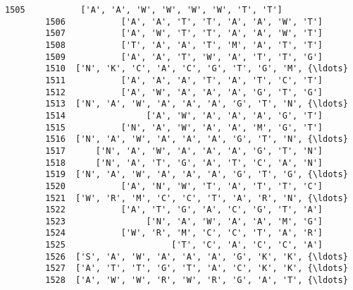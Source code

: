 \documentclass[11pt]{article}
\begin{document}
\begin{Verbatim}[commandchars=\\\{\}]
        1505           ['A', 'A', 'W', 'W', 'W', 'W', 'T', 'T']   
        1506           ['A', 'A', 'T', 'T', 'A', 'A', 'W', 'T']   
        1507           ['A', 'W', 'T', 'T', 'A', 'A', 'W', 'T']   
        1508           ['T', 'A', 'A', 'T', 'M', 'A', 'T', 'T']   
        1509           ['A', 'A', 'T', 'W', 'A', 'T', 'T', 'G']   
        1510  ['N', 'K', 'C', 'A', 'C', 'G', 'T', 'G', 'M', {\ldots}   
        1511           ['A', 'A', 'A', 'T', 'A', 'T', 'C', 'T']   
        1512           ['A', 'W', 'A', 'A', 'A', 'G', 'T', 'G']   
        1513  ['N', 'A', 'W', 'A', 'A', 'A', 'G', 'T', 'N', {\ldots}   
        1514                ['A', 'W', 'A', 'A', 'A', 'G', 'T']   
        1515           ['N', 'A', 'W', 'A', 'A', 'M', 'G', 'T']   
        1516  ['N', 'A', 'W', 'A', 'A', 'A', 'G', 'T', 'N', {\ldots}   
        1517      ['N', 'A', 'W', 'A', 'A', 'A', 'G', 'T', 'N']   
        1518      ['N', 'A', 'T', 'G', 'A', 'T', 'C', 'A', 'N']   
        1519  ['N', 'A', 'W', 'A', 'A', 'A', 'G', 'T', 'G', {\ldots}   
        1520           ['A', 'N', 'W', 'T', 'A', 'T', 'T', 'C']   
        1521  ['W', 'R', 'M', 'C', 'C', 'T', 'A', 'R', 'N', {\ldots}   
        1522           ['A', 'T', 'G', 'A', 'C', 'G', 'T', 'A']   
        1523                ['N', 'A', 'W', 'A', 'A', 'M', 'G']   
        1524           ['W', 'R', 'M', 'C', 'C', 'T', 'A', 'R']   
        1525                     ['T', 'C', 'A', 'C', 'C', 'A']   
        1526  ['S', 'A', 'W', 'A', 'A', 'A', 'G', 'K', 'K', {\ldots}   
        1527  ['A', 'T', 'T', 'G', 'T', 'A', 'C', 'K', 'K', {\ldots}   
        1528  ['A', 'W', 'W', 'R', 'W', 'R', 'G', 'A', 'T', {\ldots}   
        

\end{Verbatim}
\end{document}

